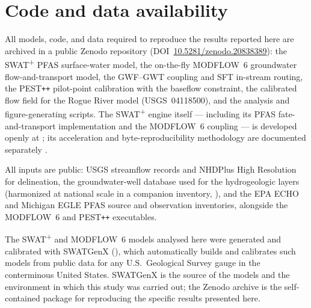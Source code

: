 \section*{Code and data availability}

All models, code, and data required to reproduce the results reported here are archived in a public
Zenodo repository (DOI~\href{https://doi.org/10.5281/zenodo.20838389}{10.5281/zenodo.20838389}): the
SWAT\textsuperscript{+} PFAS surface-water model, the on-the-fly MODFLOW~6 groundwater
flow-and-transport model, the GWF--GWT coupling and SFT in-stream routing, the PEST\texttt{++}
pilot-point calibration with the baseflow constraint, the calibrated flow field for the Rogue River
model (USGS~04118500), and the analysis and figure-generating scripts. The SWAT\textsuperscript{+}
engine itself --- including its PFAS fate-and-transport implementation and the MODFLOW~6 coupling ---
is developed openly at ; its acceleration and
byte-reproducibility methodology are documented separately \citep{rafiei2026engine}.

All inputs are public: USGS streamflow records \citep{data_usgs_nwis} and NHDPlus High Resolution
\citep{data_nhdplus_hr} for delineation, the groundwater-well database used for the hydrogeologic
layers (harmonized at national scale in a companion inventory, \citealp{rafiei2026gwinventory}), and the
EPA ECHO \citep{data_epa_echo} and Michigan EGLE \citep{data_egle_pfas} PFAS source and
observation inventories, alongside the MODFLOW~6 and PEST\texttt{++} executables.

The SWAT\textsuperscript{+} and MODFLOW~6 models analysed here were generated and calibrated with
SWATGenX \citep{Rafiei2026SWATGenX} (), which automatically builds and
calibrates such models from public data for any U.S.\ Geological Survey gauge in the conterminous
United States. SWATGenX is the
source of the models and the environment in which this study was carried out; the Zenodo archive is
the self-contained package for reproducing the specific results presented here.
